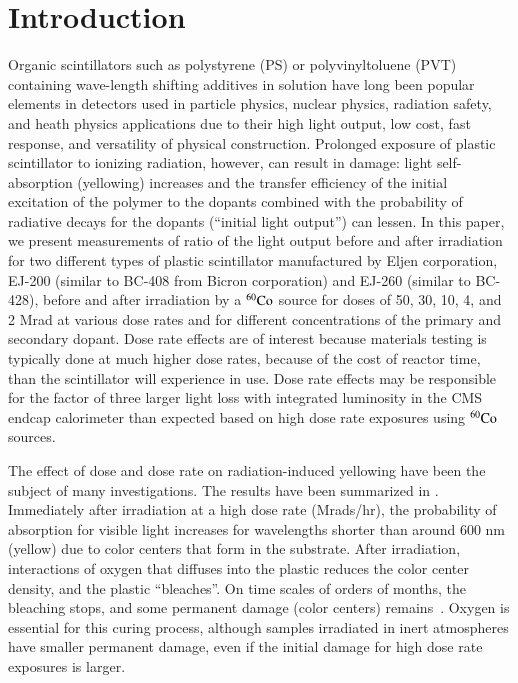 \documentclass[review]{elsarticle}
\begin{document}
\section{Introduction}
Organic scintillators such as polystyrene (PS) or polyvinyltoluene (PVT)
containing wave-length shifting
additives in solution have long been popular elements in detectors used
in particle physics, nuclear physics, radiation safety, and heath physics applications  due to their high light output, low cost, fast response,
and versatility of physical construction. 
Prolonged exposure of plastic scintillator to
ionizing radiation, however, can result in damage:
light self-absorption (yellowing) increases and
the transfer efficiency of the initial excitation of the polymer to the
dopants combined with the probability of radiative decays for the dopants (``initial light output'') can lessen.  
In this paper, we present measurements of ratio of the light output before and after irradiation
for two different types of plastic scintillator manufactured by Eljen corporation, EJ-200 (similar to BC-408 from Bicron corporation) and EJ-260 (similar to BC-428), before and after irradiation by a $\rm {^{60}Co}$ source for doses of 50, 30, 10, 4, and 2 Mrad at various dose rates and for different concentrations of the primary and secondary dopant.
Dose rate effects are of interest because materials testing is typically done at much higher dose rates, because of the cost of reactor time, than the scintillator will experience in use.  Dose rate effects may be responsible for the
factor of three larger light loss with integrated luminosity 
in the CMS endcap calorimeter\cite{phaseiitdr,ecfa2015}
than expected based
on high dose rate exposures using ${\rm ^{60}Co}$ sources.

The effect of dose and dose rate on radiation-induced yellowing have been the subject of many investigations. The results have been summarized in \cite{sauli}.  
Immediately after irradiation at a high dose rate (Mrads/hr), 
the probability of absorption for visible light increases for wavelengths shorter than around 600 nm (yellow) due to color centers that form in the substrate\cite{Bross199135}.  
After irradiation, interactions of oxygen that diffuses into the plastic reduces the color center density, and the plastic ``bleaches''.  On time scales of orders of months, the bleaching stops, and some permanent damage (color centers) remains~\cite{sauli}.
Oxygen is essential for this curing process, although samples irradiated in inert atmospheres have smaller permanent damage, even if the initial damage for high dose rate exposures is larger\cite{zorn2}.  
\end{document}
